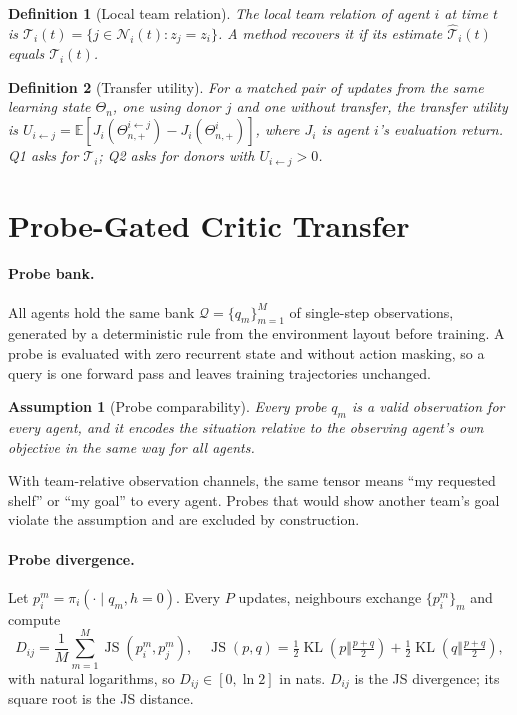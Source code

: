 \documentclass{article}
\newtheorem{assumption}{Assumption}
\newtheorem{definition}{Definition}
\theoremstyle{remark}
\newcommand{\JS}{\operatorname{JS}}
\newcommand{\KL}{\operatorname{KL}}
\begin{document}
\begin{definition}[Local team relation]
The local team relation of agent $i$ at time $t$ is $\mathcal{T}_i(t)=\{j\in\mathcal{N}_i(t): z_j=z_i\}$. A method recovers it
if its estimate $\hat{\mathcal{T}}_i(t)$ equals $\mathcal{T}_i(t)$.
\end{definition}

\begin{definition}[Transfer utility]
For a matched pair of updates from the same learning state $\Theta_n$, one using donor $j$ and one without transfer, the
transfer utility is $U_{i\leftarrow j}=\mathbb{E}[J_i(\Theta^{i\leftarrow j}_{n,+})-J_i(\Theta^{i}_{n,+})]$, where $J_i$ is
agent $i$'s evaluation return. Q1 asks for $\mathcal{T}_i$; Q2 asks for donors with $U_{i\leftarrow j}>0$.
\end{definition}

\section{Probe-Gated Critic Transfer}
\label{sec:method}
\paragraph{Probe bank.} All agents hold the same bank $\mathcal{Q}=\{q_m\}_{m=1}^{M}$ of single-step observations, generated
by a deterministic rule from the environment layout before training. A probe is evaluated with zero recurrent state and
without action masking, so a query is one forward pass and leaves training trajectories unchanged.

\begin{assumption}[Probe comparability]
\label{as:comparability}
Every probe $q_m$ is a valid observation for every agent, and it encodes the situation relative to the observing agent's
own objective in the same way for all agents.
\end{assumption}
With team-relative observation channels, the same tensor means ``my requested shelf'' or ``my goal'' to every agent.
Probes that would show another team's goal violate the assumption and are excluded by construction.

\paragraph{Probe divergence.} Let $p_i^m=\pi_i(\cdot\mid q_m,h=0)$. Every $P$ updates, neighbours exchange $\{p_i^m\}_m$ and
compute
\begin{equation}
  D_{ij}=\frac{1}{M}\sum_{m=1}^{M}\JS(p_i^m,p_j^m),\quad
  \JS(p,q)=\tfrac12\KL(p\Vert\tfrac{p+q}{2})+\tfrac12\KL(q\Vert\tfrac{p+q}{2}),
  \label{eq:div}
\end{equation}
with natural logarithms, so $D_{ij}\in[0,\ln 2]$ in nats. $D_{ij}$ is the JS divergence; its square root is the JS distance.
\end{document}
